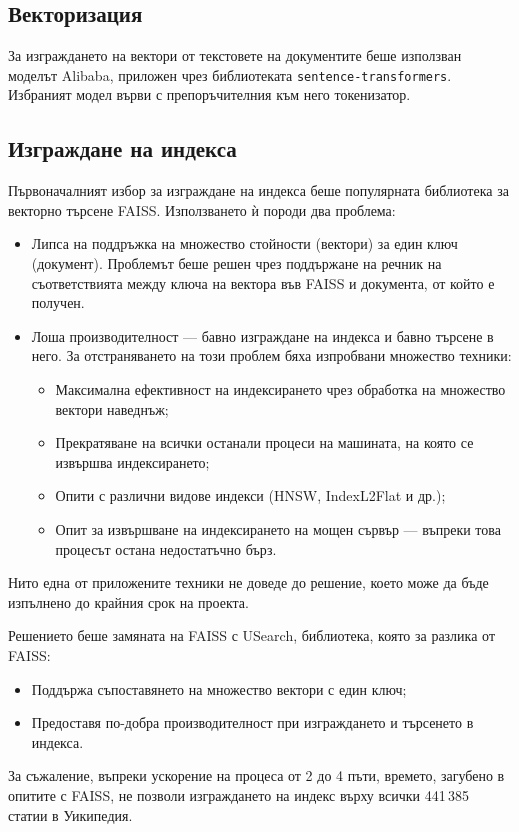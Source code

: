 \documentclass[a4paper,12pt]{article} \usepackage[utf8]{inputenc}
\begin{document}
\subsection{Векторизация} За изграждането на вектори от текстовете на
документите беше използван моделът Alibaba\cite{alibaba_model}, приложен чрез
библиотеката \texttt{sentence-transformers}. Избраният модел върви с
препоръчителния към него токенизатор.

\subsection{Изграждане на индекса} Първоначалният избор за изграждане на
индекса беше популярната библиотека за векторно търсене FAISS. Използването ѝ
породи два проблема: \begin{itemize} \item Липса на поддръжка на множество
стойности (вектори) за един ключ (документ). Проблемът беше решен чрез
поддържане на речник на съответствията между ключа на вектора във FAISS и
документа, от който е получен. \item Лоша производителност --- бавно изграждане
на индекса и бавно търсене в него. За отстраняването на този проблем бяха
изпробвани множество техники: \begin{itemize} \item Максимална ефективност на
индексирането чрез обработка на множество вектори наведнъж; \item Прекратяване
на всички останали процеси на машината, на която се извършва индексирането;
\item Опити с различни видове индекси (HNSW, IndexL2Flat и др.); \item Опит за
извършване на индексирането на мощен сървър --- въпреки това процесът остана
недостатъчно бърз. \end{itemize} \end{itemize} Нито една от приложените техники
не доведе до решение, което може да бъде изпълнено до крайния срок на проекта.

Решението беше замяната на FAISS с USearch\cite{usearch}, библиотека, която за
разлика от FAISS: \begin{itemize} \item Поддържа съпоставянето на множество
вектори с един ключ; \item Предоставя по-добра производителност при изграждането
и търсенето в индекса. \end{itemize} За съжаление, въпреки ускорение на процеса
от 2 до 4 пъти, времето, загубено в опитите с FAISS, не позволи изграждането на
индекс върху всички 441\,385 статии в Уикипедия.
\end{document}
